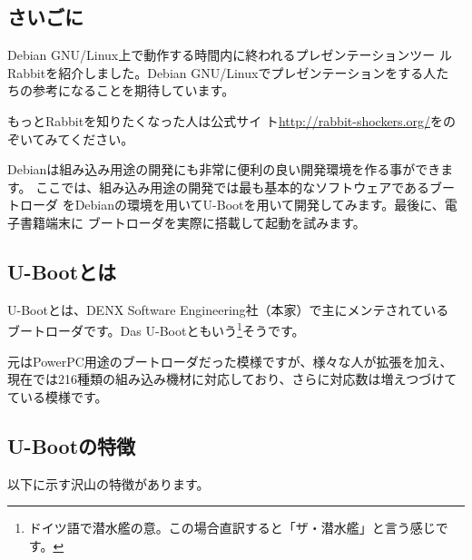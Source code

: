 \documentclass[mingoth,a4paper]{jsarticle}
\begin{document}
\subsection{さいごに}

Debian GNU/Linux上で動作する時間内に終われるプレゼンテーションツー
ルRabbitを紹介しました。Debian GNU/Linuxでプレゼンテーションをする人た
ちの参考になることを期待しています。

もっとRabbitを知りたくなった人は公式サイ
ト\url{http://rabbit-shockers.org/}をのぞいてみてください。

\label{sec:u-boot-arekore}

\vspace{2em}

Debianは組み込み用途の開発にも非常に便利の良い開発環境を作る事ができます。
ここでは、組み込み用途の開発では最も基本的なソフトウェアであるブートローダ
をDebianの環境を用いてU-Bootを用いて開発してみます。最後に、電子書籍端末に
ブートローダを実際に搭載して起動を試みます。

\subsection{U-Bootとは}

U-Bootとは、DENX Software Engineering社（本家）で主にメンテされている
ブートローダです。Das U-Bootともいう\footnote{ドイツ語で潜水艦の意。この場合直訳すると「ザ・潜水艦」と言う感じです。}そうです。

元はPowerPC用途のブートローダだった模様ですが、様々な人が拡張を加え、現在では216種類の組み込み機材に対応しており、さらに対応数は増えつづけてている模様です\cite{u-boothistory}。

\subsection{U-Bootの特徴}

以下に示す沢山の特徴があります。
\end{document}
